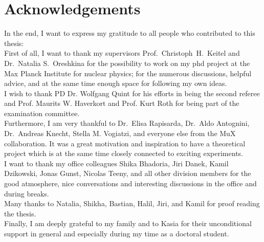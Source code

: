\chapter*{Acknowledgements}

In the end, I want to express my gratitude to all people who contributed to this thesis:\\
First of all, I want to thank my supervisors Prof.~Christoph~H.~Keitel and Dr.~Natalia S.~Oreshkina for the possibility to work on my phd project at the Max Planck Institute for nuclear physics; for the numerous discussions, helpful advice, and at the same time enough space for following my own ideas.\\
I wish to thank PD Dr. Wolfgang Quint for his efforts in being the second referee and Prof. Maurits W. Haverkort and Prof. Kurt Roth for being part of the examination committee.\\
Furthermore, I am very thankful to Dr.~Elisa Rapisarda, Dr.~Aldo Antognini, Dr.~Andreas Knecht, Stella M. Vogiatzi, and everyone else from the MuX collaboration. It was a great motivation and inspiration to have a theoretical project which is at the same time closely connected to exciting experiments.\\
I want to thank my  office colleagues Shika Bhadoria, Jiri Danek, Kamil Dzikowski, Jonas Gunst, Nicolas Teeny, and all other division members for the good atmosphere, nice conversations and interesting discussions in the office and during breaks.\\
Many thanks to Natalia, Shikha, Bastian, Halil, Jiri, and Kamil for proof reading the thesis.\\
Finally, I am deeply grateful to my family and to Kasia for their unconditional support in general and especially during my time as a doctoral student.
%



